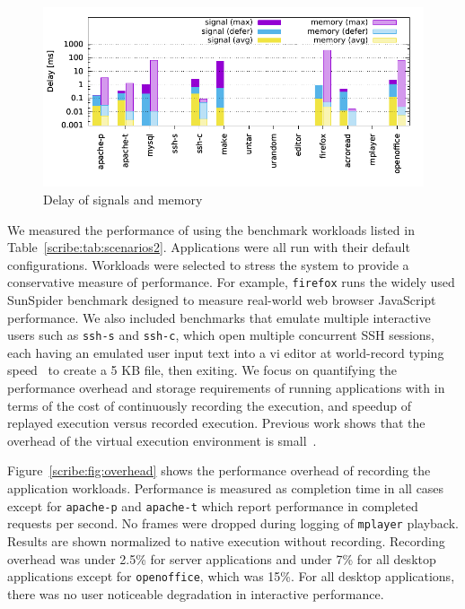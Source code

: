 \begin{figure}[t]
    \centering
    \includegraphics[width=\linewidth]{figures/scribe/delays2}
  \vspace{-5em}
    \caption{Delay of signals and memory}
    \label{scribe:fig:delays}
\end{figure}

We measured the performance of \scribe{} using the benchmark workloads
listed in Table~\ref{scribe:tab:scenarios2}.
Applications were all run with
their default configurations.  Workloads were selected to
stress the system to provide a conservative measure of performance.
For example, {\tt firefox} runs the widely used SunSpider benchmark
designed to measure real-world web browser JavaScript performance.  
We also included benchmarks that emulate multiple interactive users
such as {\tt ssh-s} and {\tt ssh-c}, which open multiple concurrent
SSH sessions, each having an emulated user input text into a vi editor
at world-record typing speed~\cite{typist} to create a 5 KB file, then
exiting. We focus on quantifying the performance overhead and storage
requirements of running applications with \scribe{} in terms of the
cost of continuously recording the execution, and speedup of replayed
execution versus recorded execution. Previous work shows that the
overhead of the virtual execution environment is
small~\cite{zap-systor10,zap02}.

Figure~\ref{scribe:fig:overhead} shows the performance overhead of recording
the application workloads.  Performance is measured as completion time
in all cases except for {\tt apache-p} and {\tt apache-t} which report
performance in completed requests per second. No frames were dropped
during logging of {\tt mplayer} playback.  Results are shown
normalized to native execution without recording.  Recording overhead
was under 2.5\% for server applications and under 7\% for all desktop
applications except for {\tt openoffice}, which was 15\%.  For all desktop
applications, there was no user noticeable degradation in interactive
performance.

